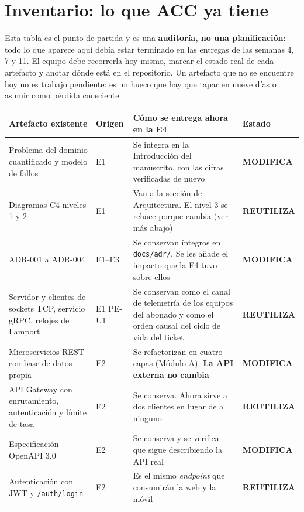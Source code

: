 \documentclass[11pt,a4paper]{article}
\newcommand{\reuso}{\cellcolor{filaReuso}\textbf{REUTILIZA}}
\newcommand{\cambia}{\cellcolor{filaCambia}\textbf{MODIFICA}}
\begin{document}
\section{Inventario: lo que ACC ya tiene}

Esta tabla es el punto de partida y es una \textbf{auditoría, no una planificación}: todo lo que aparece aquí debía estar terminado en las entregas de las semanas 4, 7 y 11. El equipo debe recorrerla hoy mismo, marcar el estado real de cada artefacto y anotar dónde está en el repositorio. Un artefacto que no se encuentre hoy no es trabajo pendiente: es un hueco que hay que tapar en nueve días o asumir como pérdida consciente.

\begin{center}
	\footnotesize
	\begin{longtable}{@{}p{3.7cm}p{1.5cm}p{5.2cm}p{4.4cm}@{}}
		\toprule
		\textbf{Artefacto existente} & \textbf{Origen} & \textbf{Cómo se entrega ahora en la E4} & \textbf{Estado} \\
		\midrule
		\endhead
		Problema del dominio cuantificado y modelo de fallos & E1 & Se integra en la Introducción del manuscrito, con las cifras verificadas de nuevo & \cambia \\
		\addlinespace
		Diagramas C4 niveles 1 y 2 & E1 & Van a la sección de Arquitectura. El nivel 3 se rehace porque cambia (ver más abajo) & \reuso \\
		\addlinespace
		ADR-001 a ADR-004 & E1--E3 & Se conservan íntegros en \texttt{docs/adr/}. Se les añade el impacto que la E4 tuvo sobre ellos & \cambia \\
		\addlinespace
		Servidor y clientes de sockets TCP, servicio gRPC, relojes de Lamport & E1 \newline PE-U1 & Se conservan como el canal de telemetría de los equipos del abonado y como el orden causal del ciclo de vida del ticket & \reuso \\
		\addlinespace
		Microservicios REST con base de datos propia & E2 & Se refactorizan en cuatro capas (Módulo A). \textbf{La API externa no cambia} & \cambia \\
		\addlinespace
		API Gateway con enrutamiento, autenticación y límite de tasa & E2 & Se conserva. Ahora sirve a dos clientes en lugar de a ninguno & \reuso \\
		\addlinespace
		Especificación OpenAPI 3.0 & E2 & Se conserva y se verifica que sigue describiendo la API real & \cambia \\
		\addlinespace
		Autenticación con JWT y \texttt{/auth/login} & E2 & Es el mismo \emph{endpoint} que consumirán la web y la móvil & \reuso \\

\end{longtable}
\end{center}
\end{document}
